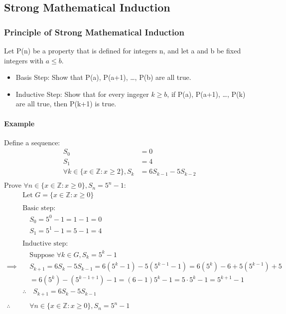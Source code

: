 \subsection{Strong Mathematical Induction}
\hrulefill

\subsubsection*{Principle of Strong Mathematical Induction}
Let P(n) be a property that is defined for integers n, and let a and b be fixed integers with $a \leq b$.
\begin{itemize}
    \item Basis Step: Show that P(a), P(a+1), \dots, P(b) are all true.
    \item Inductive Step: Show that for every ingeger $k \geq b$, if P(a), P(a+1), \dots, P(k) are all true, then P(k+1) is true.
\end{itemize}

\paragraph*{Example}
Define a sequence:
\begin{align*}
    S_0 &= 0\\
    S_1 &= 4\\
    \forall k \in \{x \in \mathbb{Z} : x \geq 2\}, S_k &= 6S_{k-1} - 5S_{k-2}\\
\end{align*}
Prove $\forall n \in \{x \in \mathbb{Z} : x \geq 0\}, S_n = 5^n - 1$:
\begin{align*}
    &\text{Let } G = \{x \in \mathbb{Z} : x \geq 0\}\\
    \\
    &\text{Basic step:}\\
    &\quad S_0 = 5^0 - 1 = 1 - 1 = 0\\
    &\quad S_1 = 5^1 - 1 = 5 - 1 = 4\\
    \\
    &\text{Inductive step:}\\
    &\quad \text{Suppose } \forall k \in G, S_k = 5^k - 1\\
    \implies& \quad S_{k+1} = 6S_k - 5S_{k-1} = 6(5^k-1) - 5(5^{k-1}-1) = 6(5^k) - 6 + 5(5^{k-1}) + 5\\
    &\quad = 6(5^k) - (5^{k-1+1}) - 1 = (6-1)5^k - 1 = 5 \cdot 5^k - 1 = 5^{k+1} - 1\\
    &\therefore \quad S_{k+1} = 6S_k - 5S_{k-1}\\
    \\
    \therefore &\quad \forall n \in \{x \in \mathbb{Z} : x \geq 0\}, S_n = 5^n - 1
\end{align*}

